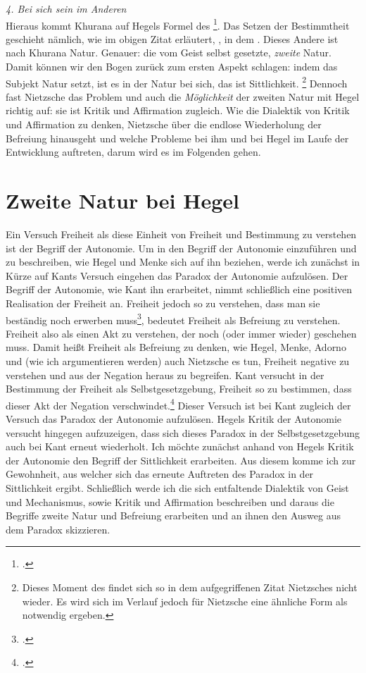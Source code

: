 \documentclass[12pt, a4paper, openany]{report}
\begin{document}
\emph{4. Bei sich sein im Anderen}\\
Hieraus kommt Khurana auf Hegels Formel des \footcite[][283]{khurana_freiheit_2017}.
Das Setzen der Bestimmtheit geschieht nämlich, wie im obigen Zitat erläutert, , in dem . 
Dieses Andere ist nach Khurana Natur. 
Genauer: die vom Geist selbst gesetzte, \emph{zweite} Natur.
Damit können wir den Bogen zurück zum ersten Aspekt schlagen: 
indem das Subjekt Natur setzt, ist es in der Natur bei sich, das ist Sittlichkeit.%
\footnote{
    Dieses Moment des  findet sich so in dem aufgegriffenen Zitat Nietzsches nicht wieder. 
    Es wird sich im Verlauf jedoch für Nietzsche eine ähnliche Form als notwendig ergeben.
}
Dennoch fast Nietzsche das Problem und auch die \emph{Möglichkeit} der zweiten Natur mit Hegel richtig auf: 
sie ist Kritik und Affirmation zugleich.
Wie die Dialektik von Kritik und Affirmation zu denken, Nietzsche über die endlose Wiederholung der Befreiung hinausgeht und welche Probleme bei ihm und bei Hegel im Laufe der Entwicklung auftreten, darum wird es im Folgenden gehen.

\section{Zweite Natur bei Hegel}\label{abschnitt_1}
Ein Versuch Freiheit als diese Einheit von Freiheit und Bestimmung zu verstehen ist der Begriff der Autonomie. 
Um in den Begriff der Autonomie einzuführen und zu beschreiben, wie Hegel und Menke sich auf ihn beziehen, werde ich zunächst in Kürze auf Kants Versuch eingehen das Paradox der Autonomie aufzulösen.
Der Begriff der Autonomie, wie Kant ihn erarbeitet, nimmt schließlich eine positiven Realisation der Freiheit an.
Freiheit jedoch so zu verstehen, dass man sie beständig noch erwerben muss\footcite[Vgl.][636]{nietzsche_morgenrote_1999}, bedeutet Freiheit als Befreiung zu verstehen. 
Freiheit also als einen Akt zu verstehen, der noch (oder immer wieder) geschehen muss.
Damit heißt Freiheit als Befreiung zu denken, wie Hegel, Menke, Adorno und (wie ich argumentieren werden) auch Nietzsche es tun, Freiheit negative zu verstehen und aus der Negation heraus zu begreifen.
Kant versucht in der Bestimmung der Freiheit als Selbstgesetzgebung, Freiheit so zu bestimmen, dass dieser Akt der Negation verschwindet.\footcite[Vgl.][53]{menke_autonomie_2018}
Dieser Versuch ist bei Kant zugleich der Versuch das Paradox der Autonomie aufzulösen. 
Hegels Kritik der Autonomie versucht hingegen aufzuzeigen, dass sich dieses Paradox in der Selbstgesetzgebung auch bei Kant erneut wiederholt.
Ich möchte zunächst anhand von Hegels Kritik der Autonomie den Begriff der Sittlichkeit erarbeiten.
Aus diesem komme ich zur Gewohnheit, aus welcher sich das erneute Auftreten des Paradox in der Sittlichkeit ergibt.
Schließlich werde ich die sich entfaltende Dialektik von Geist und Mechanismus, sowie Kritik und Affirmation beschreiben und daraus die Begriffe zweite Natur und Befreiung erarbeiten und an ihnen den Ausweg aus dem Paradox skizzieren.
\end{document}
